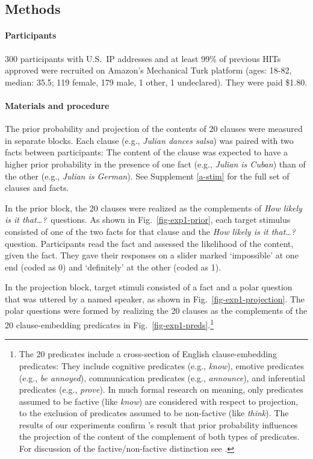 \documentclass[11pt,fleqn]{article}
\newcommand{\6}{\mbox{$[\hspace*{-.6mm}[$}}
\newcommand{\9}{\mbox{$]\hspace*{-.6mm}]$}}
\newcommand{\citepos}[1]{\citeauthor{#1}'s \citeyear{#1}}
\begin{document}
\subsection{Methods} 
 
\paragraph{Participants} 300 participants with U.S.\ IP addresses and at least 99\% of previous HITs approved were recruited on Amazon's Mechanical Turk platform (ages: 18-82, median: 35.5; 119 female, 179 male, 1 other, 1 undeclared). They were paid \$1.80.

\paragraph{Materials and procedure} The prior probability and projection of the contents of 20 clauses were measured in separate blocks. Each clause (e.g., \emph{Julian dances salsa}) was paired with two facts between participants: The content of the clause was expected to have a higher prior probability in the presence of one fact (e.g., \emph{Julian is Cuban}) than of the other (e.g., \emph{Julian is German}). See Supplement \ref{a-stim} for the full set of clauses and facts. 

In the prior block, the 20 clauses were realized as the complements of {\em How likely is it that\ldots?}~questions. As shown in Fig.~\ref{fig-exp1-prior}, each target stimulus consisted of one of the two facts for that clause and the {\em How likely is it that\ldots?} question. 
Participants read the fact and assessed the likelihood of the content, given the fact. They gave their responses on a slider marked `impossible' at one end (coded as 0) and `definitely' at the other (coded as 1). 

In the projection block, target stimuli consisted of a fact and a polar question that was uttered by a named speaker, as shown in Fig.~\ref{fig-exp1-projection}. The polar questions were formed by realizing the 20 clauses as the complements of the 20 clause-embedding predicates in Fig.~\ref{fig-exp1-preds}.\footnote{The 20 predicates include a cross-section of English clause-embedding predicates: They include cognitive predicates (e.g., {\em know}), emotive predicates (e.g., {\em be annoyed}), communication predicates (e.g., {\em announce}), and inferential predicates (e.g., {\em prove}). In much formal research on meaning, only predicates assumed to be factive (like {\em know}) are considered with respect to projection, to the exclusion of predicates assumed to be non-factive (like {\em think}). The results of our experiments confirm \citepos{mahler2020} result that prior probability influences the projection of the content of the complement of both types of predicates. For discussion of the factive/non-factive distinction see .} 
\end{document}
